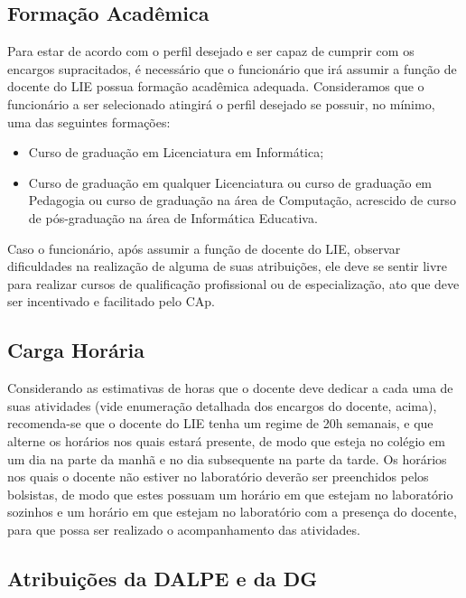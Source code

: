\subsection{Formação Acadêmica}\label{chp:LABEL_CHP_CONC_SEC_DOC_SUBSEC_FORM_ACAD}

Para estar de acordo com o perfil desejado e ser capaz de cumprir com os encargos supracitados, é necessário que o funcionário que irá assumir a função de docente do LIE possua formação acadêmica adequada. Consideramos que o funcionário a ser selecionado atingirá o perfil desejado se possuir, no mínimo, uma das seguintes formações:

\begin{itemize}
\item Curso de graduação em Licenciatura em Informática;

\item Curso de graduação em qualquer Licenciatura ou curso de graduação em Pedagogia ou curso de graduação na área de Computação, acrescido de curso de pós-graduação na área de Informática Educativa.
\end{itemize}

Caso o funcionário, após assumir a função de docente do LIE, observar dificuldades na realização de alguma de suas atribuições, ele deve se sentir livre para realizar cursos de qualificação profissional ou de especialização, ato que deve ser incentivado e facilitado pelo CAp.

\subsection{Carga Horária}\label{chp:LABEL_CHP_CONC_SEC_DOC_SUBSEC_CAR_HOR}

Considerando as estimativas de horas que o docente deve dedicar a cada uma de suas atividades (vide enumeração detalhada dos encargos do docente, acima), recomenda-se que o docente do LIE tenha um regime de 20h semanais, e que alterne os horários nos quais estará presente, de modo que esteja no colégio em um dia na parte da manhã e no dia subsequente na parte da tarde. Os horários nos quais o docente não estiver no laboratório deverão ser preenchidos pelos bolsistas, de modo que estes possuam um horário em que estejam no laboratório sozinhos e um horário em que estejam no laboratório com a presença do docente, para que possa ser realizado o acompanhamento das atividades.

\subsection{Atribuições da DALPE e da DG}\label{chp:LABEL_CHP_CONC_SEC_DOC_SUBSEC_ATRIB}

